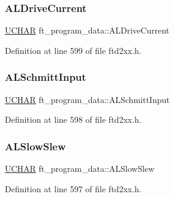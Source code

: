 \subsubsection{\texorpdfstring{A\+L\+Drive\+Current}{ALDriveCurrent}}
{\footnotesize\ttfamily \hyperlink{CatCaloProto40MHz_2inc_2WinTypes_8h_a4f4bb67531a9bf6f0b9c6ad76aeba587}{U\+C\+H\+AR} ft\+\_\+program\+\_\+data\+::\+A\+L\+Drive\+Current}



Definition at line 599 of file ftd2xx.\+h.

\mbox{\label{structft__program__data_a1c6f11e949ab0c1ac413d8143b28f44b}} 
\subsubsection{\texorpdfstring{A\+L\+Schmitt\+Input}{ALSchmittInput}}
{\footnotesize\ttfamily \hyperlink{CatCaloProto40MHz_2inc_2WinTypes_8h_a4f4bb67531a9bf6f0b9c6ad76aeba587}{U\+C\+H\+AR} ft\+\_\+program\+\_\+data\+::\+A\+L\+Schmitt\+Input}



Definition at line 598 of file ftd2xx.\+h.

\mbox{\label{structft__program__data_a1a161ae5da233c198ace0e36bb6c7ffa}} 
\subsubsection{\texorpdfstring{A\+L\+Slow\+Slew}{ALSlowSlew}}
{\footnotesize\ttfamily \hyperlink{CatCaloProto40MHz_2inc_2WinTypes_8h_a4f4bb67531a9bf6f0b9c6ad76aeba587}{U\+C\+H\+AR} ft\+\_\+program\+\_\+data\+::\+A\+L\+Slow\+Slew}



Definition at line 597 of file ftd2xx.\+h.

\mbox{\label{structft__program__data_a0f63cc46538a3e21eba64f404ab4ae25}} 
